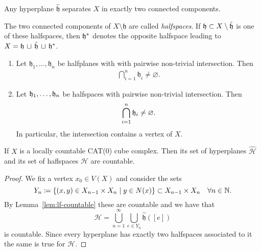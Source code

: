 \begin{thm}
  Any hyperplane \(\mathfrak{\hat h}\) separates \(X\) in exactly two connected components.
\end{thm}

\begin{defin}[Halfspaces]
  The two connected components of \(X \setminus \mathfrak{h}\) are called \emph{halfspaces}. If \(\mathfrak{h} \subset X \setminus \mathfrak{\hat h}\) is one of these halfspaces, then \(\mathfrak{h}^\ast\) denotes the opposite halfspace leading to \(X = \mathfrak{h}\, \sqcup\, \mathfrak{\hat h}\, \sqcup\, \mathfrak{h}^\ast \).
\end{defin}

\begin{thm}
  \label{thm:common-intersection}
  \begin{enumerate}
  \item Let \(\mathfrak{h}_1, \dots, \mathfrak{h}_n\) be halfplanes with with pairwise non-trivial intersection. Then
    \begin{align*}
      \bigcap_{i=1}^n \mathfrak{h}_i \neq \varnothing.
    \end{align*}
  \item Let \(\mathfrak{h}_1, \dots, \mathfrak{h}_n\) be halfspaces with pairwise non-trivial intersection. Then
    \begin{align*}
      \bigcap_{i=1}^n \mathfrak{h}_i \neq \varnothing.
    \end{align*}
    In particular, the intersection contains a vertex of \(X\).
  \end{enumerate}
\end{thm}


\begin{cor}
  If \(X\) is a locally countable CAT(0) cube complex. Then its set of hyperplanes \(\mathcal{\hat H}\) and its set of haflspaces \(\mathcal{H}\) are countable.
\end{cor}

\begin{proof}
  We fix a vertex \(x_0 \in V(X)\) and consider the sets
  \[
    Y_n \coloneqq \{(x,y) \in X_{n-1} \times X_{n} \mid y \in N(x)\} \subset X_{n-1} \times X_n \quad \forall n \in \mathbb{N}.
  \]
  By Lemma~\ref{lem:lf-countable} these are countable and we have that
  \[
    \mathcal{\hat H} = \bigcup_{n=1}^\infty \bigcup_{e \in Y_n} \mathfrak{\hat h}([e])
  \]
  is countable. Since every hyperplane has exactly two halfspaces associated to it the same is true for \(\mathcal{H}\).
\end{proof}


